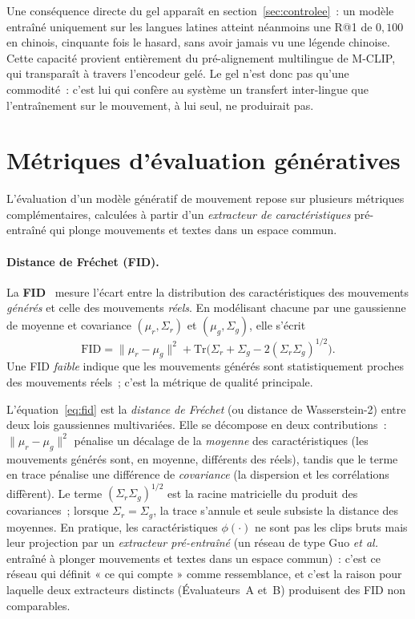 \documentclass[12pt,a4paper,oneside]{report}
\theoremstyle{definition}
\theoremstyle{plain}
\begin{document}
Une conséquence directe du gel apparaît en section~\ref{sec:controlee}~: un modèle
entraîné uniquement sur les langues latines atteint néanmoins une R@1 de $0{,}100$
en chinois, cinquante fois le hasard, sans avoir jamais vu une légende chinoise.
Cette capacité provient entièrement du pré-alignement multilingue de M-CLIP, qui
transparaît à travers l'encodeur gelé. Le gel n'est donc pas qu'une commodité~:
c'est lui qui confère au système un transfert inter-lingue que l'entraînement sur le
mouvement, à lui seul, ne produirait pas.

\section{Métriques d'évaluation génératives}
\label{sec:metriques}

L'évaluation d'un modèle génératif de mouvement repose sur plusieurs métriques
complémentaires, calculées à partir d'un \emph{extracteur de caractéristiques}
pré-entraîné qui plonge mouvements et textes dans un espace commun.

\paragraph{Distance de Fréchet (FID).} La \textbf{FID}~\cite{heusel2017fid}
mesure l'écart entre la distribution des caractéristiques des mouvements
\emph{générés} et celle des mouvements \emph{réels}. En modélisant chacune par
une gaussienne de moyenne et covariance $(\mu_r,\Sigma_r)$ et
$(\mu_g,\Sigma_g)$, elle s'écrit
\begin{equation}
\mathrm{FID} = \lVert\mu_r - \mu_g\rVert^2
 + \mathrm{Tr}\!\Big(\Sigma_r + \Sigma_g - 2(\Sigma_r\Sigma_g)^{1/2}\Big).
\label{eq:fid}
\end{equation}
Une FID \emph{faible} indique que les mouvements générés sont statistiquement
proches des mouvements réels~; c'est la métrique de qualité principale.

L'équation~\eqref{eq:fid} est la \emph{distance de Fréchet} (ou distance de
Wasserstein-2) entre deux lois gaussiennes multivariées. Elle se décompose en deux
contributions~: $\lVert\mu_r-\mu_g\rVert^2$ pénalise un décalage de la
\emph{moyenne} des caractéristiques (les mouvements générés sont, en moyenne,
différents des réels), tandis que le terme en trace pénalise une différence de
\emph{covariance} (la dispersion et les corrélations diffèrent). Le terme
$(\Sigma_r\Sigma_g)^{1/2}$ est la racine matricielle du produit des covariances~;
lorsque $\Sigma_r=\Sigma_g$, la trace s'annule et seule subsiste la distance des
moyennes. En pratique, les caractéristiques $\phi(\cdot)$ ne sont pas les clips
bruts mais leur projection par un \emph{extracteur pré-entraîné} (un réseau de type
Guo \emph{et al.} entraîné à plonger mouvements et textes dans un espace commun)~:
c'est ce réseau qui définit « ce qui compte » comme ressemblance, et c'est la raison
pour laquelle deux extracteurs distincts (Évaluateurs~A et~B) produisent des FID non
comparables.
\end{document}
